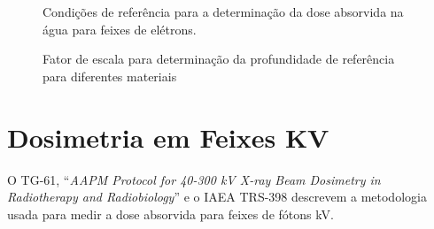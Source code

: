 \documentclass[11pt,a4paper]{article}
\begin{document}
	\begin{figure}[h]
		\centering
		\caption{Condições de referência para a determinação da dose absorvida na água para feixes de elétrons.}
		\label{fig:condicoesReferenciasDoseEletrons}
	\end{figure}

	\begin{figure}[h]
		\centering
		\caption{Fator de escala para determinação da profundidade de referência para diferentes materiais}
		\label{fig:fatorEscalaPhantons}
	\end{figure}

\section{Dosimetria em Feixes KV}

	O TG-61, ``\textit{AAPM Protocol for 40-300 kV X-ray Beam Dosimetry in Radiotherapy and Radiobiology}'' e o IAEA TRS-398 descrevem a metodologia usada para medir a dose absorvida para feixes de fótons kV. 
	
\end{document}
